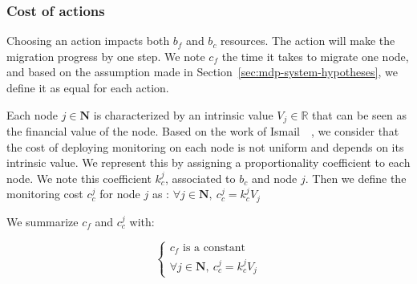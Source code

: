 \subsubsection{Cost of actions}
Choosing an action impacts both $b_f$ and $b_c$ resources. The action will make the migration progress by one step.
We note $c_f$ the time it takes to migrate one node, and based on the assumption made in Section~\ref{sec:mdp-system-hypotheses}, we define it as equal for each action.

Each node $j \in \textbf{N}$ is characterized by an intrinsic value $V_j \in \mathbb{R}$ that can be seen as the financial value of the node.
Based on the work of Ismail~\etal~\cite{interdep-ismail2017}, we consider that the cost of deploying monitoring on each node is not uniform and depends on its intrinsic value. We represent this by assigning a proportionality coefficient to each node.
We note this coefficient $k^j_{c}$, associated to $b_c$ and node $j$.
Then we define the monitoring cost $c_c^j$ for node $j$ as : $\forall j \in \textbf{N},~ c_c^j = k^j_{c}  V_j$

We summarize $c_f$ and $c_c^j$ with:

\begin{equation}
  \begin{cases}
    c_f\text{ is a constant}\\
   \forall j \in \textbf{N},~ c_c^j = k^j_{c}  V_j 
  \end{cases}
\end{equation}

